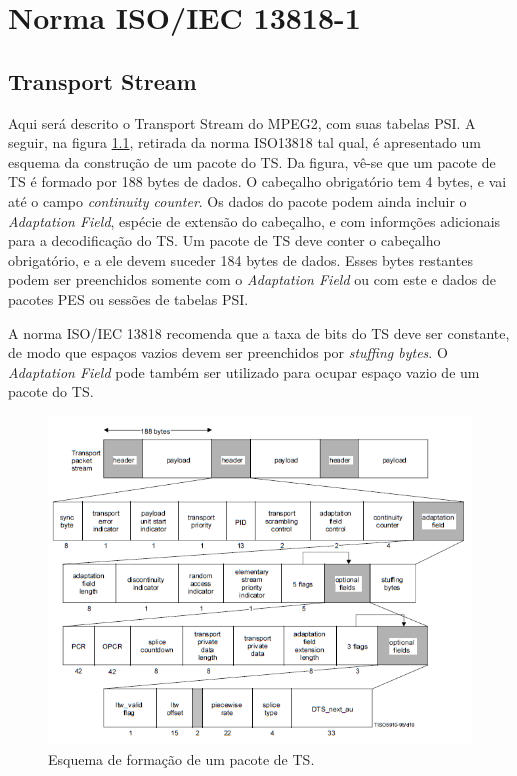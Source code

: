 \documentclass[
	12pt,				%
	openright,			%
	twoside,			%
	a4paper,			%
	english,			%
	french,				%
	brazil				%
	]{abntex2}
\begin{document}

\chapter{Norma ISO/IEC 13818-1}

\section{Transport Stream}

Aqui será descrito o Transport Stream do MPEG2, com suas tabelas PSI. A seguir, na figura
\ref{fig:TS_iso13818}, retirada da norma ISO13818 tal qual, é apresentado um esquema da construção de
um pacote do TS. Da figura, vê-se que um pacote de TS é formado por 188 bytes de dados. O cabeçalho
obrigatório tem 4 bytes, e vai até o campo \textit{continuity counter}. Os dados do pacote podem ainda
incluir o \textit{Adaptation Field}, espécie de extensão do cabeçalho, e com informções adicionais para
a decodificação do TS. Um pacote de TS deve conter o cabeçalho obrigatório, e a ele devem suceder 184 bytes
de dados. Esses bytes restantes podem ser preenchidos somente com o \textit{Adaptation Field} ou com este
e dados de pacotes PES ou sessões de tabelas PSI. 

A norma ISO/IEC 13818 recomenda que a taxa de bits do TS deve ser constante, de modo que espaços vazios devem
ser preenchidos por \textit{stuffing bytes}. O \textit{Adaptation Field} pode também ser utilizado para
ocupar espaço vazio de um pacote do TS.

\begin{figure}
\centering
\includegraphics[width=0.6\linewidth]{figuras/TS_iso13818.png}
\caption{Esquema de formação de um pacote de TS.}
\label{fig:TS_iso13818}
\end{figure}
\end{document}
